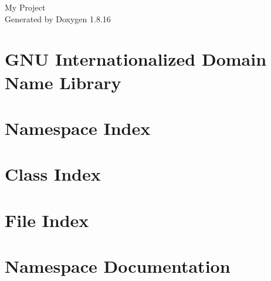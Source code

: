 \let\mypdfximage\pdfximage\def\pdfximage{\immediate\mypdfximage}\documentclass[twoside]{book}
\newcommand{\+}{\discretionary{\mbox{\scriptsize$\hookleftarrow$}}{}{}}
\newcommand{\clearemptydoublepage}{%
  \newpage{\pagestyle{empty}\cleardoublepage}%
}
\begin{document}
\hypersetup{pageanchor=false,
             bookmarksnumbered=true,
             pdfencoding=unicode
            }
\begin{titlepage}
\vspace*{7cm}
\begin{center}%
{\Large My Project }\\
\vspace*{1cm}
{\large Generated by Doxygen 1.8.16}\\
\end{center}
\end{titlepage}
\clearemptydoublepage
{}
\tableofcontents
\clearemptydoublepage
{}
\hypersetup{pageanchor=true}

\chapter{G\+NU Internationalized Domain Name Library}
\label{index}\hypertarget{index}{}
\chapter{Namespace Index}

\chapter{Class Index}

\chapter{File Index}

\chapter{Namespace Documentation}

















\end{document}
